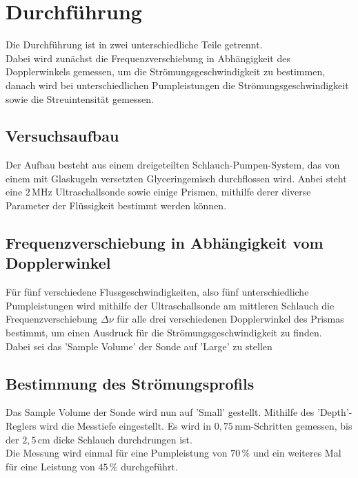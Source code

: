 \section{Durchführung}
\label{sec:Durchführung}

Die Durchführung ist in zwei unterschiedliche
Teile getrennt. \\

Dabei wird zunächst die Frequenzverschiebung in Abhängigkeit
des Dopplerwinkels gemessen, um die Strömungsgeschwindigkeit
zu bestimmen, danach wird bei unterschiedlichen Pumpleistungen 
die Strömungsgeschwindigkeit sowie die Streuintensität gemessen.

\subsection*{Versuchsaufbau}

Der Aufbau besteht aus einem dreigeteilten Schlauch-Pumpen-System, das von einem
mit Glaskugeln versetzten Glyceringemisch durchflossen wird.
Anbei steht eine $2 \, \unit{\mega\hertz}$ Ultraschallsonde sowie einige Prismen, mithilfe
derer diverse Parameter der Flüssigkeit bestimmt werden können.


\subsection*{Frequenzverschiebung in Abhängigkeit vom Dopplerwinkel}

Für fünf verschiedene Flussgeschwindigkeiten, also fünf unterschiedliche
Pumpleistungen wird mithilfe der Ultraschallsonde am mittleren
Schlauch die Frequenzverschiebung $\Delta \nu$ für alle drei verschiedenen
Dopplerwinkel des Prismas bestimmt, um einen Ausdruck für die 
Strömungsgeschwindigkeit zu finden. \\

Dabei sei das 'Sample Volume' der Sonde auf 'Large' zu stellen

\subsection*{Bestimmung des Strömungsprofils}

Das Sample Volume der Sonde wird nun auf 'Small' gestellt.
Mithilfe des 'Depth'-Reglers wird die Messtiefe eingestellt.
Es wird in $0,75 \,\unit{\milli\meter}$-Schritten gemessen, bis der
$2,5 \,\unit{\centi\meter}$ dicke Schlauch durchdrungen ist. \\

Die Messung wird einmal für eine Pumpleistung von $70 \,\%$ und
ein weiteres Mal für eine Leistung von $45 \,\%$ durchgeführt.
